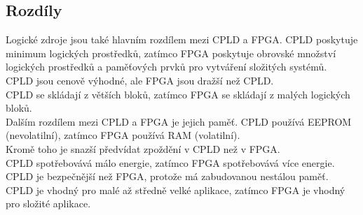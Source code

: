 \subsection{Rozdíly}  
Logické zdroje jsou také hlavním rozdílem mezi CPLD a FPGA. CPLD poskytuje minimum logických prostředků, zatímco FPGA poskytuje obrovské množství logických prostředků a paměťových prvků pro vytváření složitých systémů.\\
CPLD jsou cenově výhodné, ale FPGA jsou dražší než CPLD.\\
CPLD se skládají z větších bloků, zatímco FPGA se skládají z malých logických bloků.\\
Dalším rozdílem mezi CPLD a FPGA je jejich paměť. CPLD používá EEPROM (nevolatilní), zatímco FPGA používá RAM (volatilní).\\
Kromě toho je snazší předvídat zpoždění v CPLD než v FPGA.\\
 CPLD spotřebovává málo energie, zatímco FPGA spotřebovává více energie.\\
 CPLD je bezpečnější než FPGA, protože má zabudovanou nestálou paměť.\\
 CPLD je vhodný pro malé až středně velké aplikace, zatímco FPGA je vhodný pro složité aplikace.\\
  
  
  
  
  
  
  
  
  
  
  
  
  